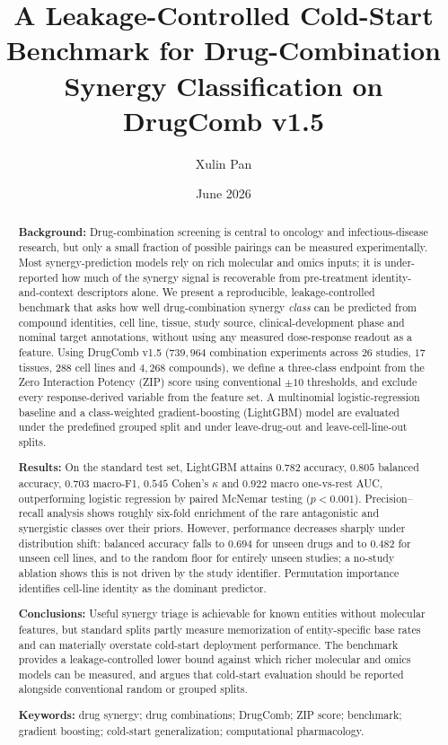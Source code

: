 \documentclass[11pt]{article}
\title{\textbf{A Leakage-Controlled Cold-Start Benchmark for Drug-Combination Synergy
Classification on DrugComb v1.5}}
\author[1]{Xulin Pan}
\affil[1]{The Pennsylvania State University, University Park, PA, USA \\ \texttt{xxp5066@psu.edu}}
\date{June 2026}
\begin{document}
\maketitle

\begin{abstract}
\noindent
\textbf{Background:}
Drug-combination screening is central to oncology and infectious-disease research, but only a small
fraction of possible pairings can be measured experimentally. Most synergy-prediction models rely on
rich molecular and omics inputs; it is under-reported how much of the synergy signal is recoverable
from pre-treatment identity-and-context descriptors alone. We present a reproducible,
leakage-controlled benchmark that asks how well drug-combination synergy \emph{class} can be predicted
from compound identities, cell line, tissue, study source, clinical-development phase and nominal
target annotations, without using any measured dose-response readout as a feature. Using DrugComb v1.5
($739{,}964$ combination experiments across $26$ studies, $17$ tissues, $288$ cell lines and
$4{,}268$ compounds), we define a three-class endpoint from the Zero Interaction Potency (ZIP) score
using conventional $\pm 10$ thresholds, and exclude every response-derived variable from the feature
set. A multinomial logistic-regression baseline and a class-weighted gradient-boosting (LightGBM) model
are evaluated under the predefined grouped split and under leave-drug-out and leave-cell-line-out
splits.

\smallskip\noindent
\textbf{Results:}
On the standard test set, LightGBM attains $0.782$ accuracy, $0.805$ balanced accuracy, $0.703$
macro-F1, $0.545$ Cohen's $\kappa$ and $0.922$ macro one-vs-rest AUC, outperforming logistic regression
by paired McNemar testing ($p<0.001$). Precision--recall analysis shows roughly six-fold enrichment of
the rare antagonistic and synergistic classes over their priors. However, performance decreases sharply
under distribution shift: balanced accuracy falls to $0.694$ for unseen drugs and to $0.482$ for unseen
cell lines, and to the random floor for entirely unseen studies; a no-study ablation shows this is not
driven by the study identifier. Permutation importance identifies cell-line identity as the dominant
predictor.

\smallskip\noindent
\textbf{Conclusions:}
Useful synergy triage is achievable for known entities without molecular features, but standard splits
partly measure memorization of entity-specific base rates and can materially overstate cold-start
deployment performance. The benchmark provides a leakage-controlled lower bound against which richer
molecular and omics models can be measured, and argues that cold-start evaluation should be reported
alongside conventional random or grouped splits.
\medskip

\noindent\textbf{Keywords:} drug synergy; drug combinations; DrugComb; ZIP score; benchmark;
gradient boosting; cold-start generalization; computational pharmacology.
\end{abstract}
\end{document}
